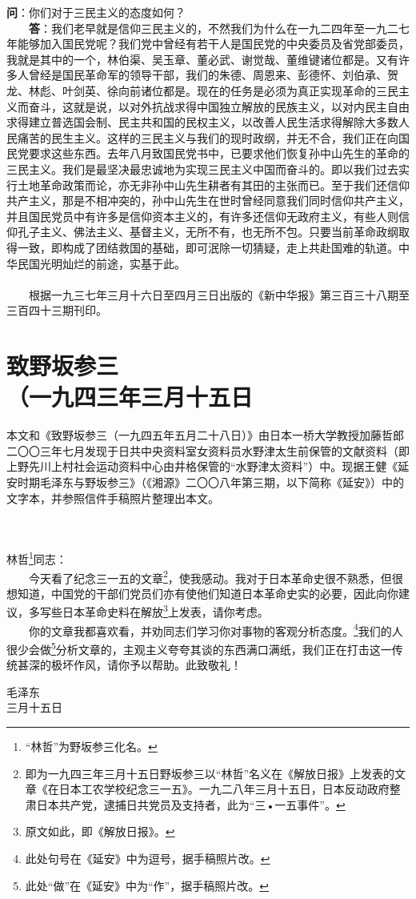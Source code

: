 \documentclass[cn,11pt,chinese]{elegantbook}
\def\myformat#1{\hfil\hfil #1}
\begin{document}
\textbf{问}：你们对于三民主义的态度如何？\\
　　\textbf{答}：我们老早就是信仰三民主义的，不然我们为什么在一九二四年至一九二七年能够加入国民党呢？我们党中曾经有若干人是国民党的中央委员及省党部委员，我就是其中的一个，林伯渠、吴玉章、董必武、谢觉哉、董维键诸位都是。又有许多人曾经是国民革命军的领导干部，我们的朱德、周恩来、彭德怀、刘伯承、贺龙、林彪、叶剑英、徐向前诸位都是。现在的任务是必须为真正实现革命的三民主义而奋斗，这就是说，以对外抗战求得中国独立解放的民族主义，以对内民主自由求得建立普选国会制、民主共和国的民权主义，以改善人民生活求得解除大多数人民痛苦的民生主义。这样的三民主义与我们的现时政纲，并无不合，我们正在向国民党要求这些东西。去年八月致国民党书中，已要求他们恢复孙中山先生的革命的三民主义。我们是最坚决最忠诚地为实现三民主义中国而奋斗的。即以我们过去实行土地革命政策而论，亦无非孙中山先生耕者有其田的主张而已。至于我们还信仰共产主义，那是不相冲突的，孙中山先生在世时曾经同意我们同时信仰共产主义，并且国民党员中有许多是信仰资本主义的，有许多还信仰无政府主义，有些人则信仰孔子主义、佛法主义、基督主义，无所不有，也无所不包。只要当前革命政纲取得一致，即构成了团结救国的基础，即可泯除一切猜疑，走上共赴国难的轨道。中华民国光明灿烂的前途，实基于此。\\~\\
　　根据一九三七年三月十六日至四月三日出版的《新中华报》第三百三十八期至三百四十三期刊印。
\newpage
\section*{\myformat{致野坂参三}\\\myformat{（一九四三年三月十五日}}
\begin{introduction}\item
本文和《致野坂参三（一九四五年五月二十八日）》由日本一桥大学教授加藤哲郎二〇〇三年七月发现于日共中央资料室女资料员水野津太生前保管的文献资料（即上野先川上村社会运动资料中心由井格保管的“水野津太资料”）中。现据王健《延安时期毛泽东与野坂参三》（《湘源》二〇〇八年第三期，以下简称《延安》）中的文字本，并参照信件手稿照片整理出本文。
\end{introduction}
\\~\\
林哲\footnote[1]{“林哲”为野坂参三化名。}同志：\\
　　今天看了纪念三一五的文章\footnote[2]{即为一九四三年三月十五日野坂参三以“林哲”名义在《解放日报》上发表的文章《在日本工农学校纪念三一五》。一九二八年三月十五日，日本反动政府整肃日本共产党，逮捕日共党员及支持者，此为“三•一五事件”。}，使我感动。我对于日本革命史很不熟悉，但很想知道，中国党的干部们党员们亦有使他们知道日本革命史实的必要，因此向你建议，多写些日本革命史料在解放\footnote[3]{原文如此，即《解放日报》。}上发表，请你考虑。\\
　　你的文章我都喜欢看，并劝同志们学习你对事物的客观分析态度。\footnote[4]{此处句号在《延安》中为逗号，据手稿照片改。}我们的人很少会做\footnote[5]{此处“做”在《延安》中为“作”，据手稿照片改。}分析文章的，主观主义夸夸其谈的东西满口满纸，我们正在打击这一传统甚深的极坏作风，请你予以帮助。此致敬礼！\\
\begin{flushright}
毛泽东\\
三月十五日
\end{flushright}
\end{document}
